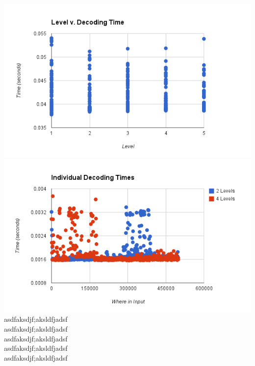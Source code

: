 \documentclass{article}
\begin{document}
\includegraphics[scale=0.4]{images/betterlevel_v_decode}
\includegraphics[scale=0.4]{images/individual_decodetime}
\afterpage{\vfill}
asdfaksdjf;aksldfjadsf\\
asdfaksdjf;aksldfjadsf\\
asdfaksdjf;aksldfjadsf\\
asdfaksdjf;aksldfjadsf\\
asdfaksdjf;aksldfjadsf\\
\end{document}
